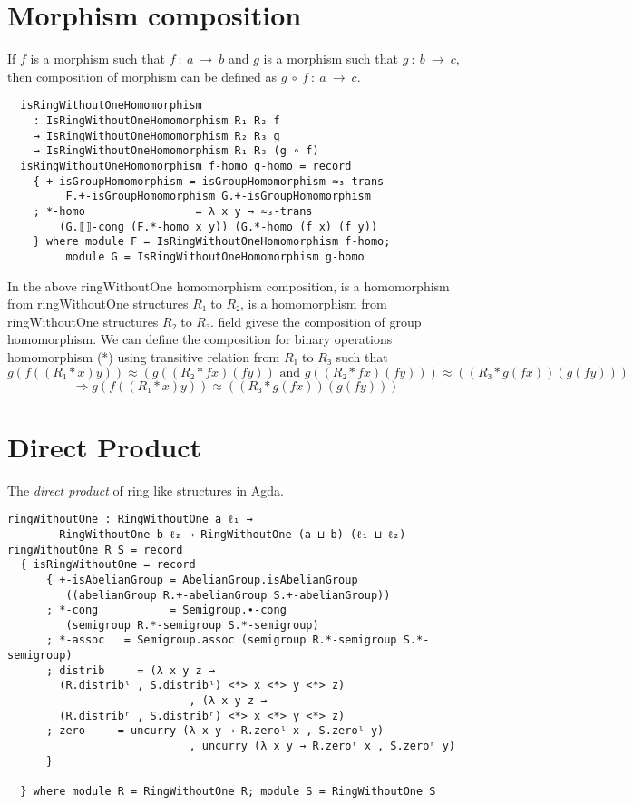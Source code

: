 \section{Morphism composition}
If $f$ is a morphism such that $f\ :\ a \ \rightarrow \ b$ and $g$ is a morphism
such that $g\ :\ b\ \rightarrow \ c$, then composition of morphism can be
defined as $g \ ∘\ f\ :\ a \ \rightarrow \ c$.
\begin{verbatim}
  isRingWithoutOneHomomorphism
    : IsRingWithoutOneHomomorphism R₁ R₂ f
    → IsRingWithoutOneHomomorphism R₂ R₃ g
    → IsRingWithoutOneHomomorphism R₁ R₃ (g ∘ f)
  isRingWithoutOneHomomorphism f-homo g-homo = record
    { +-isGroupHomomorphism = isGroupHomomorphism ≈₃-trans
		 F.+-isGroupHomomorphism G.+-isGroupHomomorphism
    ; *-homo                 = λ x y → ≈₃-trans 
		(G.⟦⟧-cong (F.*-homo x y)) (G.*-homo (f x) (f y))
    } where module F = IsRingWithoutOneHomomorphism f-homo;
		 module G = IsRingWithoutOneHomomorphism g-homo
\end{verbatim}
In the above ringWithoutOne homomorphism composition,  is a
homomorphism from ringWithoutOne structures $R₁$ to $R₂$,  is a
homomorphism from ringWithoutOne structures $R₂$ to $R₃$.
 field givese the composition of group homomorphism.
We can define the composition for binary operations homomorphism (*) using
transitive relation  from $R₁$ to $R₃$ such that \[g (f ((R₁ * x)
y)) ≈ (g ((R₂ * f x) (f y)) \text{ and } g ((R₂ * f x) (f y))) ≈ ((R₃ * g (f x))
(g (f y)))\]
\[\Rightarrow g (f ((R₁ * x) y)) ≈ ((R₃ * g (f x)) (g (f y)))\]
\section{Direct Product}
The \textit{direct product} of ring like structures in Agda.
\begin{verbatim}
ringWithoutOne : RingWithoutOne a ℓ₁ → 
		RingWithoutOne b ℓ₂ → RingWithoutOne (a ⊔ b) (ℓ₁ ⊔ ℓ₂)
ringWithoutOne R S = record
  { isRingWithoutOne = record
      { +-isAbelianGroup = AbelianGroup.isAbelianGroup
		 ((abelianGroup R.+-abelianGroup S.+-abelianGroup))
      ; *-cong           = Semigroup.∙-cong
		 (semigroup R.*-semigroup S.*-semigroup)
      ; *-assoc   = Semigroup.assoc (semigroup R.*-semigroup S.*-semigroup)
      ; distrib     = (λ x y z → 
		(R.distribˡ , S.distribˡ) <*> x <*> y <*> z)
                            , (λ x y z → 
		(R.distribʳ , S.distribʳ) <*> x <*> y <*> z)
      ; zero     = uncurry (λ x y → R.zeroˡ x , S.zeroˡ y)
                            , uncurry (λ x y → R.zeroʳ x , S.zeroʳ y)
      }

  } where module R = RingWithoutOne R; module S = RingWithoutOne S
\end{verbatim}

